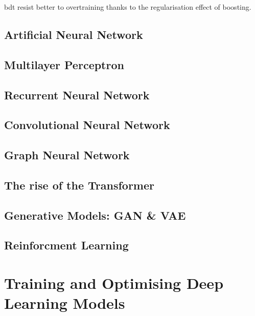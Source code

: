 \gls{bdt} resist better to overtraining thanks to the regularisation effect of boosting. 

\subsection{Artificial Neural Network}

\subsection{Multilayer Perceptron}

\subsection{Recurrent Neural Network}

\subsection{Convolutional Neural Network}

\subsection{Graph Neural Network}

\subsection{The rise of the Transformer}

\subsection{Generative Models: GAN \& VAE}

\subsection{Reinforcment Learning}

\section{Training and Optimising Deep Learning Models}

